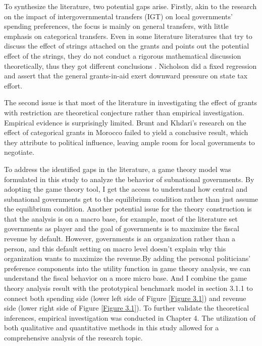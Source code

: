 To synthesize the literature, two potential gaps arise. Firstly, akin to the research on the impact of intergovernmental transfers (IGT) on local governments' spending preferences, the focus is mainly on general transfers, with little emphasis on categorical transfers. Even in some literature literatures that try to discuss the effect of strings attached on the grants and points out the potential effect of the strings, they do not conduct a rigorous mathematical discussion theoretically, thus they got different conclusions \cite{gramlich1997intergovernmental,chubb1985political,nicholson2004goal}. Nicholson \cite{nicholson2008fiscal} did a fixed regression and assert that the general grants-in-aid exert downward pressure on state tax effort.

The second issue is that most of the literature in investigating the effect of grants with restriction are theoretical conjecture rather than empirical investigation. Empirical evidence is surprisingly limited. Brunt and Khdari's \cite{2016The} research on the effect of categorical grants in Morocco failed to yield a conclusive result, which they attribute to political influence, leaving ample room for local governments to negotiate.

To address the identified gaps in the literature, a game theory model was formulated in this study to analyze the behavior of subnational governments.  By adopting the game theory tool, I get the access to understand how central and subnational governments get to the equilibrium condition rather than just assume the equilibrium condition. Another potential issue for the theory construction is that the analysis is on a macro base, for example, most of the literature set governments as player and the goal of governments is to maximize the fiscal revenue by default. However, governments is an organization rather than a person, and this default setting on macro level doesn't explain why this organization wants to maximize the revenue.By adding the personal politicians' preference components into the utility function in game theory analysis, we can understand the fiscal behavior on a more micro base. And I combine the game theory analysis result with the prototypical benchmark model in section 3.1.1 to connect both spending side (lower left side of Figure \ref{Figure 3.1}) and revenue side (lower right side of Figure \ref{Figure 3.1}). To further validate the theoretical inferences, empirical investigation was conducted in Chapter 4. The utilization of both qualitative and quantitative methods in this study allowed for a comprehensive analysis of the research topic.

